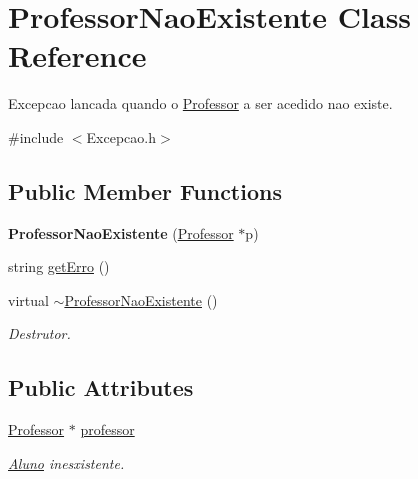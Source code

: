\hypertarget{class_professor_nao_existente}{\section{Professor\-Nao\-Existente Class Reference}
\label{class_professor_nao_existente}
}


Excepcao lancada quando o \hyperlink{class_professor}{Professor} a ser acedido nao existe.  




{\ttfamily \#include $<$Excepcao.\-h$>$}

\subsection*{Public Member Functions}
\begin{DoxyCompactItemize}
\item 
\hypertarget{class_professor_nao_existente_a010426aacae28cf35fd7b82d51a92c92}{{\bfseries Professor\-Nao\-Existente} (\hyperlink{class_professor}{Professor} $\ast$p)}\label{class_professor_nao_existente_a010426aacae28cf35fd7b82d51a92c92}

\item 
string \hyperlink{class_professor_nao_existente_a7e4f7530740f578c181f1e8d05404104}{get\-Erro} ()
\item 
\hypertarget{class_professor_nao_existente_ad0582a609813717d969ba09d93b7c1ff}{virtual \hyperlink{class_professor_nao_existente_ad0582a609813717d969ba09d93b7c1ff}{$\sim$\-Professor\-Nao\-Existente} ()}\label{class_professor_nao_existente_ad0582a609813717d969ba09d93b7c1ff}

\begin{DoxyCompactList}\small\item\em Destrutor. \end{DoxyCompactList}\end{DoxyCompactItemize}
\subsection*{Public Attributes}
\begin{DoxyCompactItemize}
\item 
\hypertarget{class_professor_nao_existente_ac9d47ada01b74d050825da7e7517bf2e}{\hyperlink{class_professor}{Professor} $\ast$ \hyperlink{class_professor_nao_existente_ac9d47ada01b74d050825da7e7517bf2e}{professor}}\label{class_professor_nao_existente_ac9d47ada01b74d050825da7e7517bf2e}

\begin{DoxyCompactList}\small\item\em \hyperlink{class_aluno}{Aluno} inesxistente. \end{DoxyCompactList}\end{DoxyCompactItemize}


